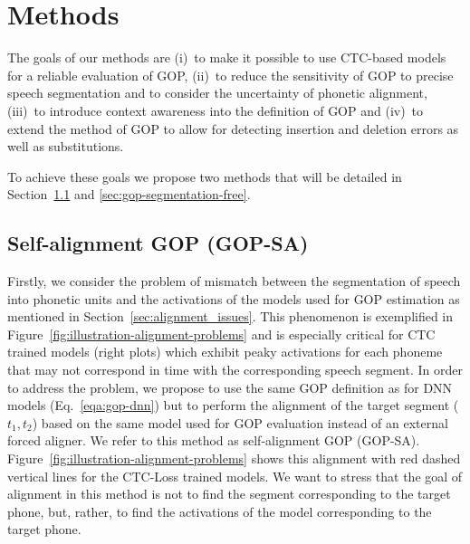 \section{Methods}
\label{sec:Methods}
The goals of our methods are (i)~to make it possible to use CTC-based models for a reliable evaluation of GOP, (ii)~to reduce the sensitivity of GOP to precise speech segmentation and to consider the uncertainty of phonetic alignment, (iii)~to introduce context awareness into the definition of GOP and (iv)~to extend the method of GOP to allow for detecting insertion and deletion errors as well as substitutions.

To achieve these goals we propose two methods that will be detailed in Section~\ref{sec:gop-self-segmentation} and \ref{sec:gop-segmentation-free}.

\subsection{Self-alignment GOP (GOP-SA)}
\label{sec:gop-self-segmentation}
Firstly, we consider the problem of mismatch between the segmentation of speech into phonetic units and the activations of the models used for GOP estimation as mentioned in Section~\ref{sec:alignment_issues}.
This phenomenon is exemplified in Figure~\ref{fig:illustration-alignment-problems} and is especially critical for CTC trained models (right plots) which exhibit peaky activations for each phoneme that may not correspond in time with the corresponding speech segment.
In order to address the problem, we propose to use the same GOP definition as for DNN models (Eq.~\ref{eqa:gop-dnn}) but to perform the alignment of the target segment ($t_1,t_2$) based on the same model used for GOP evaluation instead of an external forced aligner.
We refer to this method as self-alignment GOP (GOP-SA).
Figure~\ref{fig:illustration-alignment-problems} shows this alignment with red dashed vertical lines for the CTC-Loss trained models.
We want to stress that the goal of alignment in this method is not to find the segment corresponding to the target phone, but, rather, to find the activations of the model corresponding to the target phone.


